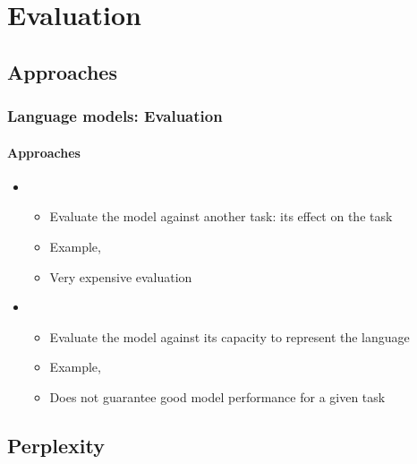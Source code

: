 \documentclass[xcolor=table]{beamer}
\begin{document}
\section{Evaluation}

\subsection{Approaches}

\begin{frame}
\frametitle{Language models: Evaluation}
\framesubtitle{Approaches}

\begin{itemize}
	\item {}
	\begin{itemize}
		\item Evaluate the model against another task: its effect on the task
		\item Example, 
		\item Very expensive evaluation
	\end{itemize}
	\item {}
	\begin{itemize}
		\item Evaluate the model against its capacity to represent the language
		\item Example, 
		\item Does not guarantee good model performance for a given task
	\end{itemize}
\end{itemize}

\end{frame}

\subsection{Perplexity}
\end{document}
